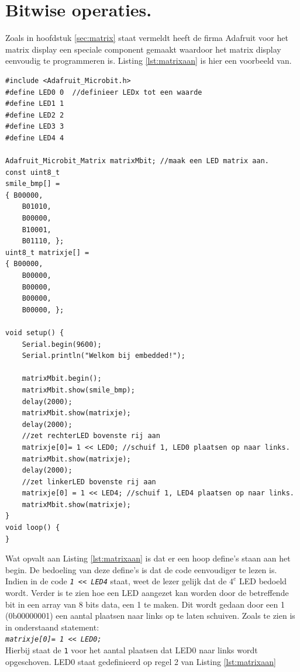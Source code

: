 
\section{Bitwise operaties.}
\label{chap:biw}

Zoals in hoofdstuk \ref{sec:matrix} staat vermeldt heeft de firma Adafruit voor het matrix display een speciale component gemaakt waardoor het matrix display eenvoudig te programmeren is. Listing \ref{lst:matrixaan} is hier een voorbeeld van.
\begin{lstlisting}[caption={Het aanzetten van een LED},label={lst:matrixaan}]
#include <Adafruit_Microbit.h>
#define LED0 0  //definieer LEDx tot een waarde
#define LED1 1
#define LED2 2
#define LED3 3
#define LED4 4

Adafruit_Microbit_Matrix matrixMbit; //maak een LED matrix aan.
const uint8_t
smile_bmp[] =
{ B00000,
	B01010,
	B00000,
	B10001,
	B01110, };
uint8_t matrixje[] =
{ B00000,
	B00000,
	B00000,
	B00000,
	B00000, };

void setup() {
	Serial.begin(9600);
	Serial.println("Welkom bij embedded!");
	
	matrixMbit.begin();
	matrixMbit.show(smile_bmp);
	delay(2000);
	matrixMbit.show(matrixje);
	delay(2000);  
	//zet rechterLED bovenste rij aan
	matrixje[0]= 1 << LED0; //schuif 1, LED0 plaatsen op naar links.
	matrixMbit.show(matrixje);
	delay(2000);  
	//zet linkerLED bovenste rij aan 
	matrixje[0] = 1 << LED4; //schuif 1, LED4 plaatsen op naar links.
	matrixMbit.show(matrixje);
}
void loop() {
}
\end{lstlisting}
Wat opvalt aan Listing \ref{lst:matrixaan} is dat er een hoop define's staan aan het begin. De bedoeling van deze define's is dat de code eenvoudiger te lezen is.
Indien in de code  \small{\texttt{\textit{1 \textless\textless  ~LED4}}} staat, weet de lezer gelijk dat de $4^{e}$ LED bedoeld wordt. Verder is te zien hoe een LED aangezet kan worden door de betreffende bit in een array van 8 bits data, een 1 te maken. Dit wordt gedaan door een 1 (0b00000001) een aantal plaatsen naar links op te laten schuiven. Zoals te zien is in onderstaand statement:\\
\texttt{\textit{matrixje[0]= 1 \textless\textless  ~LED0;}}\\
Hierbij staat de \texttt{1} voor het aantal plaatsen dat LED0 naar links wordt opgeschoven. LED0 staat gedefinieerd op regel 2 van Listing \ref{lst:matrixaan}
